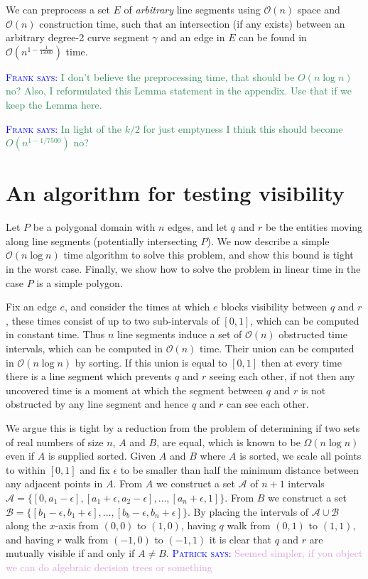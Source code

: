 \documentclass[UKenglish]{lipics-v2019}
\newcommand{\myremark}[4]{\textcolor{blue}{\textsc{#1 #2:}} \textcolor{#4}{\textsf{#3}}}
\newcommand{\frank}[2][says]{\myremark{Frank}{#1}{#2}{SeaGreen}}
\newcommand{\patrick}[2][says]{\myremark{Patrick}{#1}{#2}{Plum}}
\newcommand{\mkmcal}[1]{\ensuremath{\mathcal{#1}}\xspace}
\renewcommand{\O}{\mkmcal{O}}
\begin{document}
\begin{lemma}
\label{lemma:15000}
We can preprocess a set $E$ of \emph{arbitrary} line segments using $\mathcal{O}(n)$ space and $\mathcal{O}(n)$ construction time, such that an intersection (if any exists) between an arbitrary degree-2 curve segment $\gamma$ and an edge in $E$ can be found in $\mathcal{O}(n^{1-\frac{1}{15000}})$ time.
\end{lemma}
\frank{I don't believe the preprocessing time, that should be $O(n\log
  n)$ no? Also, I reformulated this Lemma statement in the
  appendix. Use that if we keep the Lemma here.}

\frank{In light of the $k/2$ for just emptyness I think this should
  become $O(n^{1-1/7500})$ no?}

\section{An algorithm for testing visibility}
\label{sec:oneshots}

Let $P$ be a polygonal domain with $n$ edges, and let $q$ and $r$ be the entities moving along line segments (potentially intersecting $P$). We now describe a simple $\O(n\log n)$ time algorithm to solve this problem, and show this bound is tight in the worst case. Finally, we show how to solve the problem in linear time in the case $P$ is a simple polygon.

Fix an edge $e$, and consider the times at which $e$ blocks visibility between $q$ and $r$, these times consist of up to two sub-intervals of $[0, 1]$, which can be computed in constant time. Thus $n$ line segments induce a set of $\mathcal{O}(n)$ obstructed time intervals, which can be computed in $\mathcal{O}(n)$ time. Their union can be computed in $\mathcal{O}(n \log n)$ by sorting. If this union is equal to $[0, 1]$ then at every time there is a line segment which prevents $q$ and $r$ seeing each other, if not then any uncovered time is a moment at which the segment between $q$ and $r$ is not obstructed by any line segment and hence $q$ and $r$ can see each other.

We argue this is tight by a reduction from the problem of determining if two sets of real numbers of size $n$, $A$ and $B$, are equal, which is known to be $\Omega(n \log n)$ even if $A$ is supplied sorted. \cite{FRANK SAID SO} Given $A$ and $B$ where $A$ is sorted, we scale all points to within $[0, 1]$ and fix $\epsilon$ to be smaller than half the minimum distance between any adjacent points in $A$. From $A$ we construct a set $\mathcal{A}$ of $n+1$ intervals $\mathcal{A} = \{ [0, a_1-\epsilon], [a_1+\epsilon, a_2-\epsilon], \ldots, [a_n+\epsilon, 1] \}$. From $B$ we construct a set $\mathcal{B} = \{ [b_1-\epsilon, b_1+\epsilon], \ldots, [b_b-\epsilon, b_n+\epsilon] \}$. By placing the intervals of $\mathcal{A} \cup \mathcal{B}$ along the $x$-axis from $(0, 0)$ to $(1, 0)$, having $q$ walk from $(0, 1)$ to $(1, 1)$, and having $r$ walk from $(-1, 0)$ to $(-1, 1)$ it is clear that $q$ and $r$ are mutually visible if and only if $A \neq B$.
\patrick{Seemed simpler, if you object we can do algebraic decision trees or something}
\end{document}
